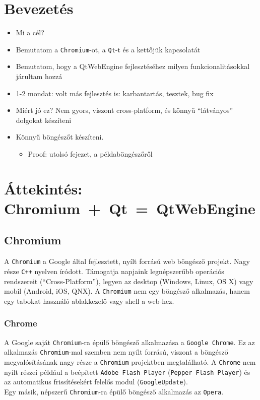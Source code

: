 \documentclass[12pt]{report}
\begin{document}

\chapter*{Bevezetés}
\begin{itemize}
    \item Mi a cél?
    \item Bemutatom a \texttt{Chromium}-ot, a \texttt{Qt}-t és a kettőjük kapcsolatát
    \item Bemutatom, hogy a QtWebEngine fejlesztéséhez milyen funkcionalitásokkal járultam
        hozzá
    \item 1-2 mondat: volt más fejlesztés is: karbantartás, tesztek, bug fix
    \item Miért jó ez? Nem gyors, viszont cross-platform, és könnyű ``látványos'' dolgokat
        készíteni
    \item Könnyű böngészőt készíteni.
        \begin{itemize}
            \item Proof: utolsó fejezet, a példaböngészőről
        \end{itemize}
\end{itemize}

\chapter{Áttekintés: \mbox{Chromium + Qt = QtWebEngine}}

\section{Chromium}
A \texttt{Chromium} a Google által fejlesztett, nyílt forrású web böngésző projekt. Nagy
része \texttt{C++} nyelven íródott. Támogatja napjaink legnépszerűbb operációs rendszereit
(``Cross-Platform''), legyen az desktop (Windows, Linux, OS X) vagy mobil (Android, iOS,
QNX).
A \texttt{Chromium} nem egy böngésző alkalmazás, hanem egy tabokat használó ablakkezelő
vagy shell a web-hez.
\cite{bib-wiki-chromium}

\subsection{Chrome}
A Google saját \texttt{Chromium}-ra épülő böngésző alkalmazása a \texttt{Google Chrome}.
Ez az alkalmazás \texttt{Chromium}-mal szemben nem nyílt forrású, viszont a böngésző
megvalósításának nagy része a \texttt{Chromium} projektben megtalálható.
A \texttt{Chrome} nem nyílt részei például a beépített \texttt{Adobe Flash Player}
(\texttt{Pepper Flash Player}) és az automatikus frissítésekért felelős modul
(\texttt{GoogleUpdate}). \cite{bib-wiki-chrome} \\
Egy másik, népszerű \texttt{Chromium}-ra épülő böngésző alkalmazás az \texttt{Opera}.
\end{document}
